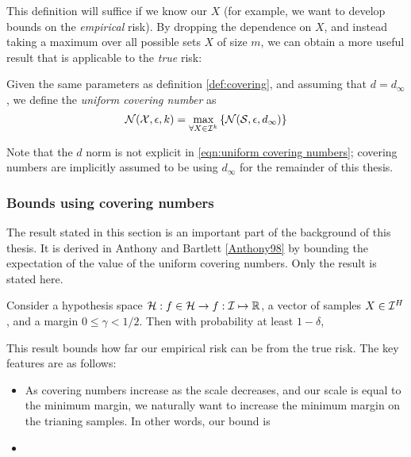 This definition will suffice if we know our $X$ (for example, we want
to develop bounds on the \emph{empirical} risk).  By dropping the dependence
on $X$, and instead taking a maximum over all possible sets $X$
of size $m$, we can obtain a more useful result that is applicable to the
\emph{true} risk:

\begin{definition}
Given the same parameters as definition \ref{def:covering}, and
assuming that $d = d_{\infty}$, we define
the \emph{uniform covering number} as
\begin{equation}
\label{eqn:uniform covering numbers}
\mathcal{N}({\mathcal{X}}, {\epsilon}, {k}) = \max_{\forall X \in \mathcal{I}^k} \left\{
\mathcal{N}({\mathcal{S}}, {\epsilon}, {d_{\infty}}) \right\} 
\end{equation}
\end{definition}

Note that the $d$ norm is not explicit in \ref{eqn:uniform covering
numbers}; covering numbers are implicitly assumed to be using
$d_{\infty}$ for the remainder of this thesis.

\subsubsection{Bounds using covering numbers}
\label{sec:covering number bounds}

The result stated in this section is an important part of the
background of this thesis.  It is derived in Anthony and Bartlett
\ref{Anthony98} by bounding the expectation of the value of the
uniform covering numbers.  Only the result is stated here.

\begin{theorem}
Consider a hypothesis space $\mathcal{H} : f \in \mathcal{H} \rightarrow f : \mathcal{I}
\mapsto \mathbb{R}$, a vector of samples $X \in \mathcal{I}^H$, and a margin
$0 \leq \gamma < 1/2$.  Then with probability at least $1 - \delta$, 

\end{theorem}

This result bounds how far our empirical risk can be from the true
risk.  The key features are as follows:
\begin{itemize}
\item	As covering numbers increase as the scale decreases, and our
	scale is equal to the minimum margin, we naturally want to
	increase the minimum margin on the trianing samples.  In other
	words, our bound is 
\item	
\end{itemize}


